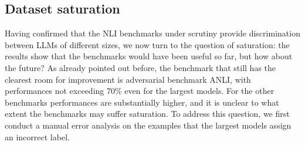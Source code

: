 \begin{table}
\centering
{}
\caption{Monotonicity values for the 8B and 70B models during the course of the training. We report both the discrete ($mon_{ACC}$) and continuous ($mon_{NLL}$) monotonicity values. ACC and NLL represent Accuracy and Negative Log Likelihood respectively.}
\label{tab:monotonicity}
\end{table}

\subsection{Dataset saturation}\label{subsec:saturation}
Having confirmed that the NLI benchmarks under scrutiny provide discrimination between LLMs of different sizes, we now turn to the question of saturation: the results show that the benchmarks would have been useful so far, but how about the future?
As already pointed out before, the benchmark that still has the clearest room for improvement is adversarial benchmark ANLI, with performances not exceeding 70\% even for the largest models.
For the other benchmarks performances are substantially higher, and it is unclear to what extent the benchmarks may suffer saturation.
To address this question, we first conduct a manual error analysis on the examples that the largest models assign an incorrect label.


